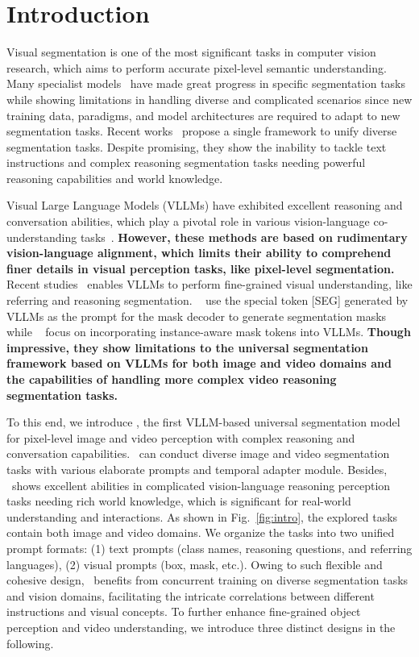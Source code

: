 \section{Introduction}\label{sec:intro}
Visual segmentation is one of the most significant tasks in computer vision research, which aims to perform accurate pixel-level semantic understanding.
Many specialist models~\cite{he2017mask,cheng2022masked,jain2023oneformer,Lai2023LISARS} have made great progress in specific segmentation tasks while showing limitations in handling diverse and complicated scenarios since new training data, paradigms, and model architectures are required to adapt to new segmentation tasks. 
Recent works~\cite{lin2023uninext,zhang2023simple,li2024omg} propose a single framework to unify diverse segmentation tasks.
Despite promising, they show the inability to tackle text instructions and complex reasoning segmentation tasks needing powerful reasoning capabilities and world knowledge.

Visual Large Language Models (VLLMs) have exhibited excellent reasoning and conversation abilities, which play a pivotal role in various vision-language co-understanding tasks~\cite{cho2021unifying,liu2024visual,li2023blip,zhu2023minigpt,bai2023qwen}. 
\textbf{However, these methods are based on rudimentary vision-language alignment, which limits their ability to comprehend finer details in visual perception tasks, like pixel-level segmentation.}
Recent studies~\cite{Lai2023LISARS,wei2024lasagna,zhang2024psalm,yan2024visa,zhang2024omg} enables VLLMs to perform fine-grained visual understanding, like referring and reasoning segmentation. 
~\cite{Lai2023LISARS,wei2024lasagna,Ren2023PixelLMPR}
use the special token [SEG] generated by VLLMs as the prompt for the mask decoder to generate segmentation masks while ~\cite{zhang2024psalm,zhang2024omg} focus on incorporating instance-aware mask tokens into VLLMs.
\textbf{Though impressive, they show limitations to the universal segmentation framework based on VLLMs for both image and video domains and the capabilities of handling more complex video reasoning segmentation tasks.}

To this end, we introduce \name, the first VLLM-based universal segmentation model for pixel-level image and video perception with complex reasoning and conversation capabilities. \name~can conduct diverse image and video segmentation tasks with various
elaborate prompts and temporal adapter module. Besides, \name~shows excellent abilities in complicated vision-language reasoning perception tasks needing rich world knowledge, which is significant for real-world understanding and interactions.
As shown in Fig.~\ref{fig:intro}, the explored tasks contain both image and video domains.
We organize the tasks into two unified prompt formats: (1) text prompts (class names, reasoning questions, and referring languages), (2) visual prompts (box, mask, etc.). 
Owing to such flexible and cohesive design, \name~benefits from concurrent training on diverse segmentation tasks and vision domains, facilitating the intricate correlations between different instructions and visual concepts.
To further enhance fine-grained object perception and video understanding, we introduce three distinct designs in the following.

